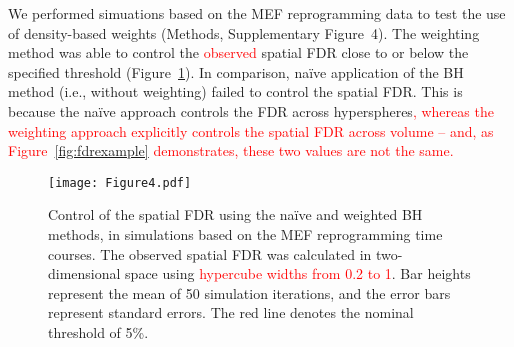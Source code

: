 \documentclass{article}
\newcommand\revised[1]{\textcolor{red}{#1}}
\newcommand{\suppfigfdr}{4}
\begin{document}
We performed simuations based on the MEF reprogramming data to test the use of density-based weights (Methods, Supplementary Figure~\suppfigfdr{}).
The weighting method was able to control the \revised{observed} spatial FDR close to or below the specified threshold (Figure~\ref{fig:fdr}).
In comparison, na\"ive application of the BH method (i.e., without weighting) failed to control the spatial FDR.
This is because the na\"ive approach controls the FDR across hyperspheres\revised{, whereas the weighting approach explicitly controls the spatial FDR across volume -- and, as Figure~\ref{fig:fdrexample} demonstrates, these two values are not the same.}


\begin{figure}[bt]
\begin{center}
\texttt{[image: Figure4.pdf]}
\end{center}
\caption{
    Control of the spatial FDR using the na\"ive and weighted BH methods, in simulations based on the MEF reprogramming time courses.
    The observed spatial FDR was calculated in two-dimensional space using \revised{hypercube widths from 0.2 to 1}.
    Bar heights represent the mean of 50 simulation iterations, and the error bars represent standard errors.
    The red line denotes the nominal threshold of 5\%.
}
\label{fig:fdr}
\end{figure}

\end{document}
